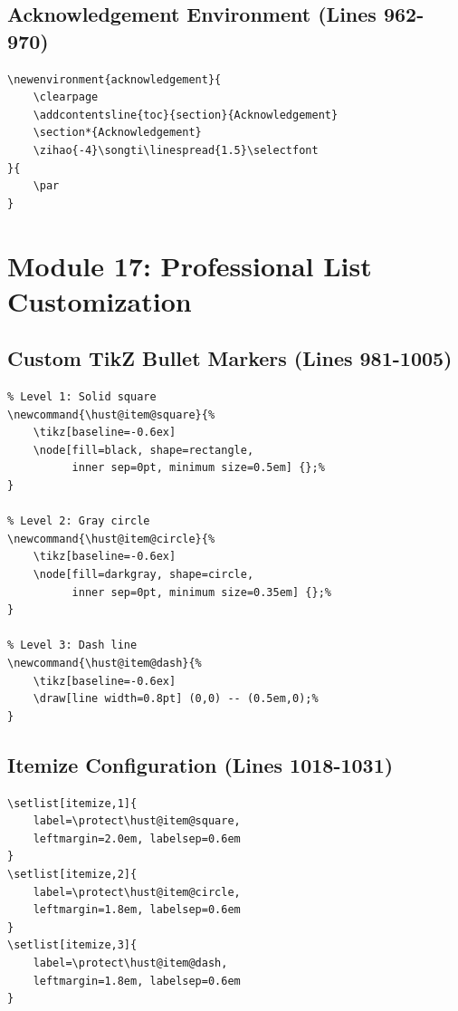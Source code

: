 \documentclass[linux]{hustreport}
\begin{document}
\subsection{Acknowledgement Environment (Lines 962-970)}

\begin{verbatim}
\newenvironment{acknowledgement}{
    \clearpage
    \addcontentsline{toc}{section}{Acknowledgement}
    \section*{Acknowledgement}
    \zihao{-4}\songti\linespread{1.5}\selectfont
}{
    \par
}
\end{verbatim}

\newpage
\section{Module 17: Professional List Customization}

\subsection{Custom TikZ Bullet Markers (Lines 981-1005)}

\begin{verbatim}
% Level 1: Solid square
\newcommand{\hust@item@square}{%
    \tikz[baseline=-0.6ex] 
    \node[fill=black, shape=rectangle, 
          inner sep=0pt, minimum size=0.5em] {};%
}

% Level 2: Gray circle
\newcommand{\hust@item@circle}{%
    \tikz[baseline=-0.6ex] 
    \node[fill=darkgray, shape=circle, 
          inner sep=0pt, minimum size=0.35em] {};%
}

% Level 3: Dash line
\newcommand{\hust@item@dash}{%
    \tikz[baseline=-0.6ex] 
    \draw[line width=0.8pt] (0,0) -- (0.5em,0);%
}
\end{verbatim}

\subsection{Itemize Configuration (Lines 1018-1031)}

\begin{verbatim}
\setlist[itemize,1]{
    label=\protect\hust@item@square,
    leftmargin=2.0em, labelsep=0.6em
}
\setlist[itemize,2]{
    label=\protect\hust@item@circle,
    leftmargin=1.8em, labelsep=0.6em
}
\setlist[itemize,3]{
    label=\protect\hust@item@dash,
    leftmargin=1.8em, labelsep=0.6em
}
\end{verbatim}
\end{document}
